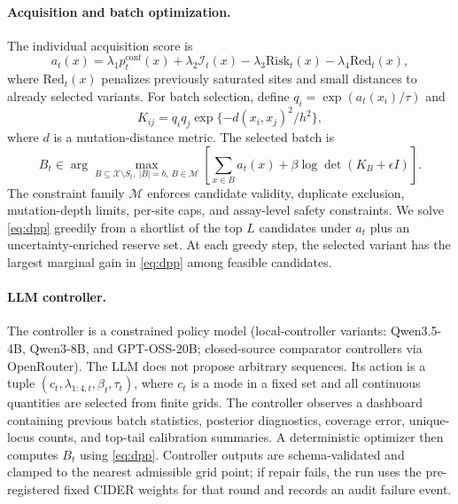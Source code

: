 \documentclass{article}
\newcommand{\method}{\textsc{CIDER}}
\newcommand{\xset}{\mathcal X}
\newcommand{\mcal}{\mathcal M}
\begin{document}
\paragraph{Acquisition and batch optimization.} The individual acquisition score is
\begin{equation}
\label{eq:acq}
a_t(x)=\lambda_1 p_t^{\mathrm{conf}}(x)+\lambda_2\mathcal I_t(x)-\lambda_3\mathrm{Risk}_t(x)-\lambda_4\mathrm{Red}_t(x),
\end{equation}
where $\mathrm{Red}_t(x)$ penalizes previously saturated sites and small distances to already selected variants. For batch selection, define $q_i=\exp(a_t(x_i)/\tau)$ and
\begin{equation}
K_{ij}=q_iq_j\exp\{-d(x_i,x_j)^2/h^2\},
\end{equation}
where $d$ is a mutation-distance metric. The selected batch is
\begin{equation}
\label{eq:dpp}
B_t\in\arg\max_{B\subseteq\xset\setminus S_t,~|B|=b,~B\in\mcal}\left[\sum_{x\in B}a_t(x)+\beta\log\det(K_B+\epsilon I)\right].
\end{equation}
The constraint family $\mcal$ enforces candidate validity, duplicate exclusion, mutation-depth limits, per-site caps, and assay-level safety constraints. We solve \cref{eq:dpp} greedily from a shortlist of the top $L$ candidates under $a_t$ plus an uncertainty-enriched reserve set. At each greedy step, the selected variant has the largest marginal gain in \cref{eq:dpp} among feasible candidates.

\paragraph{LLM controller.} The controller is a constrained policy model (local-controller variants: Qwen3.5-4B, Qwen3-8B, and GPT-OSS-20B; closed-source comparator controllers via OpenRouter). The LLM does not propose arbitrary sequences. Its action is a tuple $(c_t,\lambda_{1:4,t},\beta_t,\tau_t)$, where $c_t$ is a mode in a fixed set and all continuous quantities are selected from finite grids. The controller observes a dashboard containing previous batch statistics, posterior diagnostics, coverage error, unique-locus counts, and top-tail calibration summaries. A deterministic optimizer then computes $B_t$ using \cref{eq:dpp}. Controller outputs are schema-validated and clamped to the nearest admissible grid point; if repair fails, the run uses the pre-registered fixed \method{} weights for that round and records an audit failure event.
\end{document}
